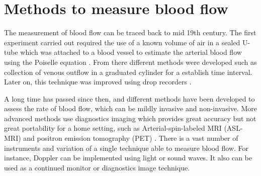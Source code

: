 %


\section{Methods to measure blood flow}
The measurement of blood flow can be traced back to mid 19th century. The first experiment carried out required the use of a known volume of air in a sealed U-tube which was attached to a blood vessel to estimate the arterial blood flow using the Poiselle equation \cite{dokunin1958modification}. From there different methods were developed such as collection of venous outflow in a graduated cylinder for a establish time interval. Later on, this technique was improved using drop recorders \cite{jayanthy2011measuring}.

A long time has passed since then, and different methods have been developed to assess the rate of blood flow, which can be mildly invasive and non-invasive. More advanced methods use diagnostics imaging which provides great accuracy but not great portability for a home setting, such as Arterial-spin-labeled MRI (ASL-MRI) \cite{schmitt2003quantitative} and positron emission tomography (PET) \cite{baron1999mapping}. There is a vast number of instruments and variation of a single technique able to measure blood flow. For instance, Doppler can be implemented using light or sound waves. It also can be used as a continued monitor or diagnostics image technique. 

